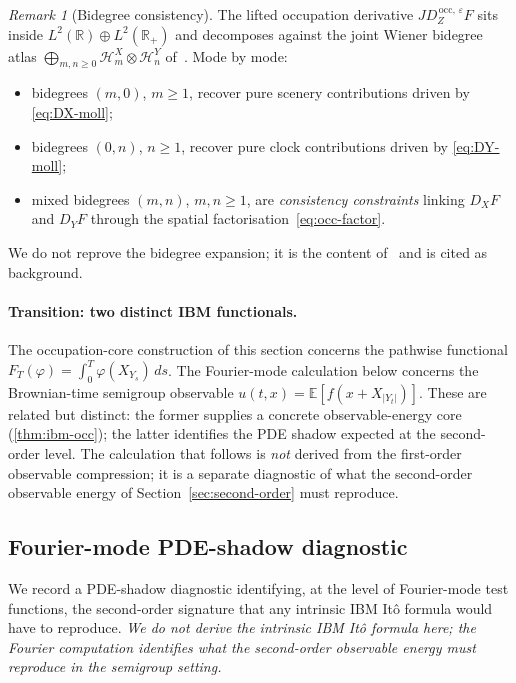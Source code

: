\documentclass[11pt,reqno]{amsart}
\theoremstyle{plain}
\theoremstyle{definition}
\theoremstyle{remark}
\newtheorem{remark}[theorem]{Remark}
\newcommand{\R}{\mathbb{R}}
\newcommand{\E}{\mathbb{E}}
\newcommand{\Hilb}{\mathcal{H}}
\newcommand{\IBM}{Z}
\begin{document}
\begin{remark}[Bidegree consistency]\label{rem:bidegree}
The lifted occupation derivative
$J D_\IBM^{\,\mathrm{occ},\,\varepsilon} F$ sits inside
$L^{2}(\R)\oplus L^{2}(\R_{+})$ and decomposes against the joint Wiener
bidegree atlas
$\bigoplus_{m,n\ge 0}\Hilb^{X}_{m}\otimes\Hilb^{Y}_{n}$
of~\cite{Fontes-IBMchaos}. Mode by mode:
\begin{itemize}
\item bidegrees $(m,0)$, $m\ge 1$, recover pure scenery contributions
  driven by \eqref{eq:DX-moll};
\item bidegrees $(0,n)$, $n\ge 1$, recover pure clock contributions
  driven by \eqref{eq:DY-moll};
\item mixed bidegrees $(m,n)$, $m,n\ge 1$, are
  \emph{consistency constraints} linking $D_X F$ and $D_Y F$ through
  the spatial factorisation~\eqref{eq:occ-factor}.
\end{itemize}
We do not reprove the bidegree expansion; it is the content
of~\cite{Fontes-IBMchaos} and is cited as background.
\end{remark}

\paragraph{Transition: two distinct IBM functionals.}
The occupation-core construction of this section concerns the pathwise
functional $F_T(\varphi)=\int_0^{T}\varphi(X_{Y_s})\,ds$. The Fourier-mode
calculation below concerns the Brownian-time semigroup observable
$u(t,x)=\E[f(x+X_{|Y_t|})]$. These are related but distinct: the
former supplies a concrete observable-energy core (\cref{thm:ibm-occ});
the latter identifies the PDE shadow expected at the second-order
level. The calculation that follows is \emph{not} derived from the
first-order observable compression; it is a separate diagnostic of
what the second-order observable energy of
Section~\ref{sec:second-order} must reproduce.

\subsection*{Fourier-mode PDE-shadow diagnostic}

We record a PDE-shadow diagnostic identifying, at the level of
Fourier-mode test functions, the second-order signature that any
intrinsic IBM It\^o formula would have to reproduce. \emph{We do not
derive the intrinsic IBM It\^o formula here; the Fourier computation
identifies what the second-order observable energy must reproduce in
the semigroup setting.}
\end{document}
